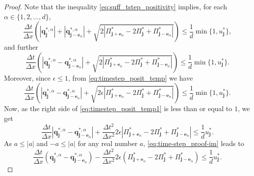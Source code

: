 \documentclass[11pt]{article}
\numberwithin{equation}{section}
\newtheorem{counter example}[theorem]{Counter Example}
\numberwithin{equation}{section}
\numberwithin{equation}{section}
\begin{document}
\begin{proof}
  Note that the inequality \eqref{eq:suff_tstep_positivity} implies, for each $\alpha \in \{1,2,\dots,d\}$,
    \begin{equation}
    \label{eq:timestep_height}
    \frac{\Delta t}{\Delta x}
\left(
\left| \mathbf{q}_{\mathbf{j}}^{*,\alpha} \right|
+
\left| \mathbf{q}_{\mathbf{j}-\mathbf{e}_\alpha}^{*,\alpha} \right|
+
\sqrt{2 \left|
\Pi_{\mathbf{j}+\mathbf{e}_\alpha}^*
-2\Pi_{\mathbf{j}}^*
+\Pi_{\mathbf{j}-\mathbf{e}_\alpha}^*
\right|}
\right)
\leq
\frac{1}{d}\min\{1, u^*_{\mathbf j}\}, 
    \end{equation}
    and further 
\begin{equation}
\label{eq:timestep_posit_temp}
\frac{\Delta t}{\Delta x}
\left(
\left| \mathbf{q}_{\mathbf{j}}^{*,\alpha} - \mathbf{q}_{\mathbf{j}-\mathbf{e}_\alpha}^{*,\alpha} \right|
+
\sqrt{2 \left|
\Pi_{\mathbf{j}+\mathbf{e}_\alpha}^*
-2\Pi_{\mathbf{j}}^*
+\Pi_{\mathbf{j}-\mathbf{e}_\alpha}^*
\right|}
\right)
\leq
\frac{1}{d}\min\{1, u^*_{\mathbf j}\}. 
\end{equation}
Moreover, since $\epsilon\leq1$, from \eqref{eq:timestep_posit_temp} we have
\begin{equation}
\label{eq:timestep_posit_temp1}
\frac{\Delta t}{\Delta x}
\left(
\left| \mathbf{q}_{\mathbf{j}}^{*,\alpha} - \mathbf{q}_{\mathbf{j}-\mathbf{e}_\alpha}^{*,\alpha} \right|
+
\sqrt{2 \epsilon\left|
\Pi_{\mathbf{j}+\mathbf{e}_\alpha}^*
-2\Pi_{\mathbf{j}}^*
+\Pi_{\mathbf{j}-\mathbf{e}_\alpha}^*
\right|}
\right)
\leq
\frac{1}{d}\min\{1, u^*_{\mathbf j}\}. 
\end{equation}
Now, as the right side of \eqref{eq:timestep_posit_temp1} is less than or equal to
$1$, we get
\begin{equation}
\label{eq:time-step_proof-im}
    \frac{\Delta t}{\Delta x}
\left| \mathbf{q}_{\mathbf{j}}^{*,\alpha} - \mathbf{q}_{\mathbf{j}-\mathbf{e}_\alpha}^{*,\alpha} \right|
+
\frac{\Delta t^2}{\Delta x^2}2\epsilon \left|
\Pi_{\mathbf{j}+\mathbf{e}_\alpha}^*
-2\Pi_{\mathbf{j}}^*
+\Pi_{\mathbf{j}-\mathbf{e}_\alpha}^*
\right|
\leq
\frac{1}{d}u^*_{\mathbf j}. 
\end{equation}
As $a\leq |a|$ and $-a\leq |a|$ for any real number $a$, \eqref{eq:time-step_proof-im} leads to 
\begin{equation}
\label{eq:time-step_proof-last}
    \frac{\Delta t}{\Delta x}
\left( \mathbf{q}_{\mathbf{j}}^{*,\alpha} - \mathbf{q}_{\mathbf{j}-\mathbf{e}_\alpha}^{*,\alpha} \right)
-
\frac{\Delta t^2}{\Delta x^2}2\epsilon \left(
\Pi_{\mathbf{j}+\mathbf{e}_\alpha}^*
-2\Pi_{\mathbf{j}}^*
+\Pi_{\mathbf{j}-\mathbf{e}_\alpha}^*
\right)
\leq
\frac{1}{d}u^*_{\mathbf j}. 
\end{equation}


\end{proof}
\end{document}
